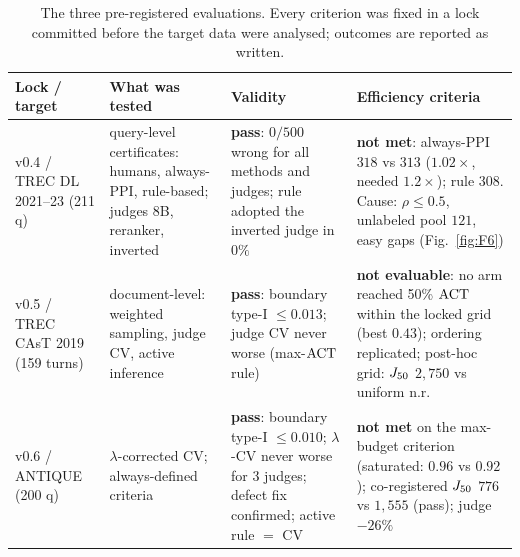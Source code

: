 \begin{table}[t]\centering\small
\caption{The three pre-registered evaluations. Every criterion was fixed in a lock committed before the target data were analysed; outcomes are reported as written.}\label{tab:locks}
\begin{tabular}{p{2.4cm}p{3.2cm}p{4.6cm}p{4.6cm}}\toprule
Lock / target & What was tested & Validity & Efficiency criteria\\\midrule
v0.4 / TREC DL 2021--23 (211 q) & query-level certificates: humans, always-PPI, rule-based; judges 8B, reranker, inverted & \textbf{pass}: $0/500$ wrong for all methods and judges; rule adopted the inverted judge in $0\%$ & \textbf{not met}: always-PPI $318$ vs $313$ ($1.02\times$, needed $1.2\times$); rule $308$. Cause: $\rho\le0.5$, unlabeled pool $121$, easy gaps (Fig.~\ref{fig:F6})\\
v0.5 / TREC CAsT 2019 (159 turns) & document-level: weighted sampling, judge CV, active inference & \textbf{pass}: boundary type-I $\le0.013$; judge CV never worse (max-$\mathrm{ACT}$ rule) & \textbf{not evaluable}: no arm reached 50\% $\mathrm{ACT}$ within the locked grid (best $0.43$); ordering replicated; post-hoc grid: $J_{50}$ $2{,}750$ vs uniform n.r.\\
v0.6 / ANTIQUE (200 q) & $\lambda$-corrected CV; always-defined criteria & \textbf{pass}: boundary type-I $\le0.010$; $\lambda$-CV never worse for 3 judges; defect fix confirmed; active rule $=$ CV & \textbf{not met} on the max-budget criterion (saturated: $0.96$ vs $0.92$); co-registered $J_{50}$ $776$ vs $1{,}555$ (pass); judge $-26\%$\\\bottomrule
\end{tabular}
\end{table}
